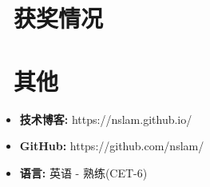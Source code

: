 \documentclass{resume}
\begin{document}
\section{\faHeartO\ 获奖情况}

\section{\faInfo\ 其他}
\begin{itemize}[parsep=0.5ex]
  \item \textbf{技术博客: }https://nslam.github.io/
  \item \textbf{GitHub: }https://github.com/nslam/
  \item \textbf{语言: }英语 - 熟练(CET-6)
\end{itemize}

%
%
\end{document}
